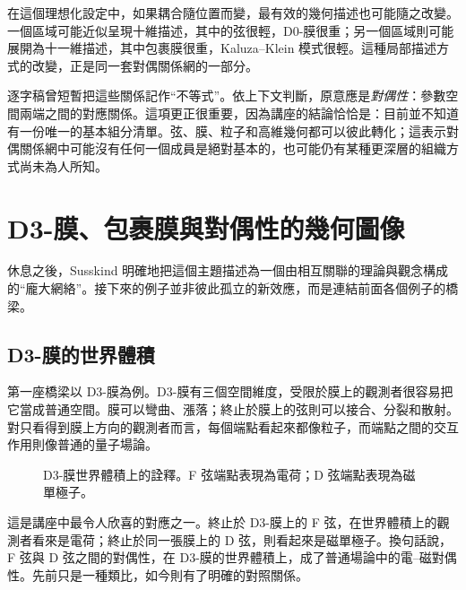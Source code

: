 在這個理想化設定中，如果耦合隨位置而變，最有效的幾何描述也可能隨之改變。一個區域可能近似呈現十維描述，其中的弦很輕，D0-膜很重；另一個區域則可能展開為十一維描述，其中包裹膜很重，Kaluza--Klein 模式很輕。這種局部描述方式的改變，正是同一套對偶關係網的一部分。

逐字稿曾短暫把這些關係記作``不等式''。依上下文判斷，原意應是\emph{對偶性}：參數空間兩端之間的對應關係。這項更正很重要，因為講座的結論恰恰是：目前並不知道有一份唯一的基本組分清單。弦、膜、粒子和高維幾何都可以彼此轉化；這表示對偶關係網中可能沒有任何一個成員是絕對基本的，也可能仍有某種更深層的組織方式尚未為人所知。

\section{D3-膜、包裹膜與對偶性的幾何圖像}

休息之後，Susskind 明確地把這個主題描述為一個由相互關聯的理論與觀念構成的``龐大網絡''。接下來的例子並非彼此孤立的新效應，而是連結前面各個例子的橋梁。

\subsection{D3-膜的世界體積}

第一座橋梁以 D3-膜為例。D3-膜有三個空間維度，受限於膜上的觀測者很容易把它當成普通空間。膜可以彎曲、漲落；終止於膜上的弦則可以接合、分裂和散射。對只看得到膜上方向的觀測者而言，每個端點看起來都像粒子，而端點之間的交互作用則像普通的量子場論。

\begin{figure}[htbp]
\centering
{}%
\caption{D3-膜世界體積上的詮釋。F 弦端點表現為電荷；D 弦端點表現為磁單極子。}
\end{figure}

這是講座中最令人欣喜的對應之一。終止於 D3-膜上的 F 弦，在世界體積上的觀測者看來是電荷；終止於同一張膜上的 D 弦，則看起來是磁單極子。換句話說，F 弦與 D 弦之間的對偶性，在 D3-膜的世界體積上，成了普通場論中的電--磁對偶性。先前只是一種類比，如今則有了明確的對照關係。


